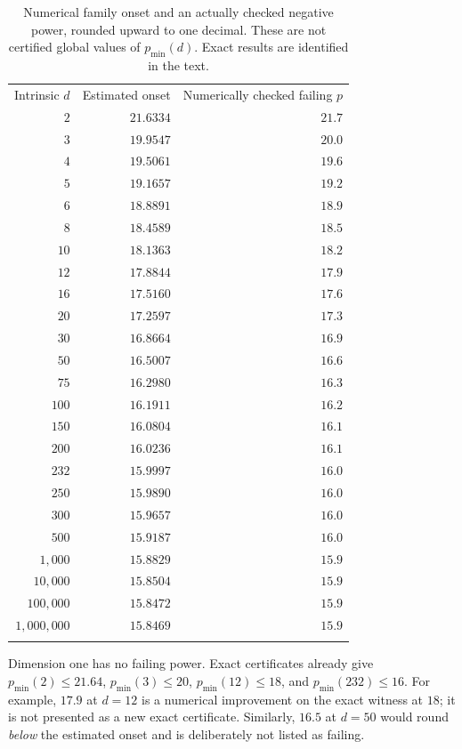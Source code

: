 \documentclass[11pt]{article}
\theoremstyle{definition}
\newcommand{\toprule}{\noalign{\hrule height 0.8pt\vskip4pt}}
\newcommand{\midrule}{\noalign{\vskip3pt\hrule height 0.4pt\vskip3pt}}
\newcommand{\bottomrule}{\noalign{\vskip3pt\hrule height 0.8pt}}
\begin{document}
\begin{table}[htbp]
\centering\small
\begin{tabular}{@{}rrr@{}}
\toprule
Intrinsic $d$ & Estimated onset & Numerically checked failing $p$\\
\midrule
$2$ & $21.6334$ & $21.7$\\
$3$ & $19.9547$ & $20.0$\\
$4$ & $19.5061$ & $19.6$\\
$5$ & $19.1657$ & $19.2$\\
$6$ & $18.8891$ & $18.9$\\
$8$ & $18.4589$ & $18.5$\\
$10$ & $18.1363$ & $18.2$\\
$12$ & $17.8844$ & $17.9$\\
$16$ & $17.5160$ & $17.6$\\
$20$ & $17.2597$ & $17.3$\\
$30$ & $16.8664$ & $16.9$\\
$50$ & $16.5007$ & $16.6$\\
$75$ & $16.2980$ & $16.3$\\
$100$ & $16.1911$ & $16.2$\\
$150$ & $16.0804$ & $16.1$\\
$200$ & $16.0236$ & $16.1$\\
$232$ & $15.9997$ & $16.0$\\
$250$ & $15.9890$ & $16.0$\\
$300$ & $15.9657$ & $16.0$\\
$500$ & $15.9187$ & $16.0$\\
$1{,}000$ & $15.8829$ & $15.9$\\
$10{,}000$ & $15.8504$ & $15.9$\\
$100{,}000$ & $15.8472$ & $15.9$\\
$1{,}000{,}000$ & $15.8469$ & $15.9$\\
\bottomrule
\end{tabular}
\caption{Numerical family onset and an actually checked negative power,
rounded upward to one decimal. These are not certified global values of
$p_{\min}(d)$. Exact results are identified in the text.}
\label{tab:dimensionprofile}
\end{table}
Dimension one has no failing power. Exact certificates already give
$p_{\min}(2)\le21.64$, $p_{\min}(3)\le20$, $p_{\min}(12)\le18$,
and $p_{\min}(232)\le16$. For example, $17.9$ at $d=12$ is a numerical
improvement on the exact witness at $18$; it is not presented as a new
exact certificate. Similarly, $16.5$ at $d=50$ would round \emph{below}
the estimated onset and is deliberately not listed as failing.
\end{document}
